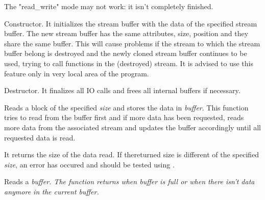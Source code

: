 
The "read\_write" mode may not work: it isn't completely finished.


Constructor. It initializes the stream buffer with the data of the specified
stream buffer. The new stream buffer has the same attributes, size, position
and they share the same buffer. This will cause problems if the stream to
which the stream buffer belong is destroyed and the newly cloned stream
buffer continues to be used, trying to call functions in the (destroyed)
stream. It is advised to use this feature only in very local area of the
program.





Destructor. It finalizes all IO calls and frees all internal buffers if
necessary.

\label{wxstreambufferread}


Reads a block of the specified {\it size} and stores the data in {\it buffer}.
This function tries to read from the buffer first and if more data has been
requested, reads more data from the associated stream and updates the buffer
accordingly until all requested data is read.


It returns the size of the data read. If thereturned size is different of the specified 
{\it size}, an error has occured and should be tested using 
.


Reads a \it{buffer}. The function returns when \it{buffer} is full or when there isn't
data anymore in the current buffer.



\label{wxstreambufferwrite}

